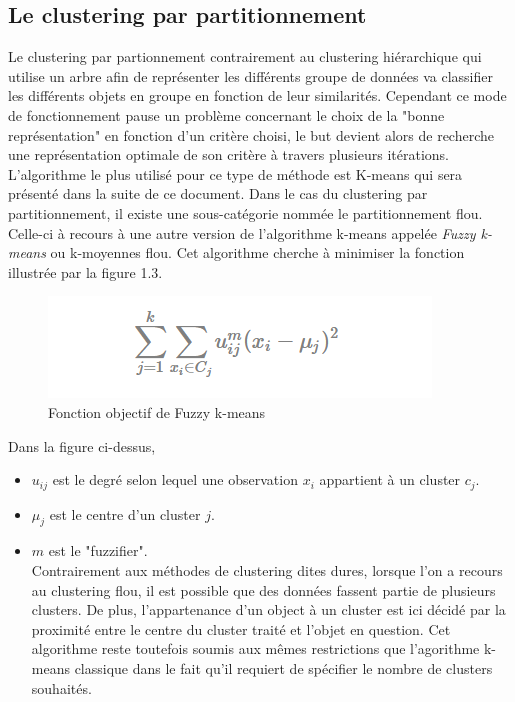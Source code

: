 \documentclass[memoire.tex]{subfiles}
\begin{document}
\newpage
\subsection{Le clustering par partitionnement}
Le clustering par partionnement contrairement au clustering hiérarchique qui utilise un arbre afin de représenter les différents groupe de données va classifier les différents objets en groupe en fonction de leur similarités. Cependant ce mode de fonctionnement pause un problème concernant le choix de la "bonne représentation" en fonction d'un critère choisi, le but devient alors de recherche une représentation optimale de son critère à travers plusieurs itérations.\cite{ref8} L'algorithme le plus utilisé pour ce type de méthode est K-means qui sera présenté dans la suite de ce document. Dans le cas du clustering par partitionnement, il existe une sous-catégorie nommée le partitionnement flou. Celle-ci à recours à une autre version de l'algorithme k-means appelée \textit{Fuzzy k-means} ou k-moyennes flou. Cet algorithme cherche à minimiser la fonction illustrée par la figure 1.3.
	\begin{figure}[h!]
		\centerline{\includegraphics[scale=0.8]{img/fuzzy_algo.png}}
		\caption{Fonction objectif de Fuzzy k-means}
	\end{figure}
Dans la figure ci-dessus, \begin{itemize}
\item $u_{ij}$ est le degré selon lequel une observation $x_{i}$ appartient à un cluster $c_{j}$.
\item $\mu_j$ est le centre d'un cluster $j$.
\item $m$ est le "fuzzifier".\\
Contrairement aux méthodes de clustering dites dures, lorsque l'on a recours au clustering flou, il est possible que des données fassent partie de plusieurs clusters. De plus, l'appartenance d'un object à un cluster est ici décidé par la proximité entre le centre du cluster traité et l'objet en question. \cite{ref13} Cet algorithme reste toutefois soumis aux mêmes restrictions que l'agorithme k-means classique dans le fait qu'il requiert de spécifier le nombre de clusters souhaités.
\end{itemize}
\end{document}
